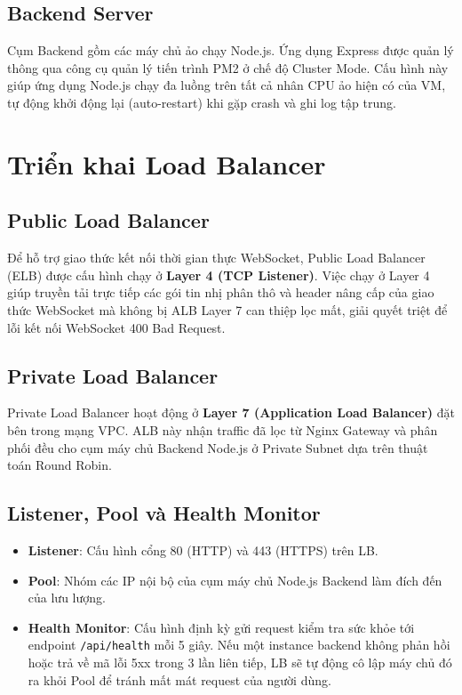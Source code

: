 \documentclass[12pt, a4paper]{article}
\begin{document}
\subsection{Backend Server}
Cụm Backend gồm các máy chủ ảo chạy Node.js. Ứng dụng Express được quản lý thông qua công cụ quản lý tiến trình PM2 ở chế độ Cluster Mode. Cấu hình này giúp ứng dụng Node.js chạy đa luồng trên tất cả nhân CPU ảo hiện có của VM, tự động khởi động lại (auto-restart) khi gặp crash và ghi log tập trung.



\section{Triển khai Load Balancer}

\subsection{Public Load Balancer}
Để hỗ trợ giao thức kết nối thời gian thực WebSocket, Public Load Balancer (ELB) được cấu hình chạy ở \textbf{Layer 4 (TCP Listener)}. Việc chạy ở Layer 4 giúp truyền tải trực tiếp các gói tin nhị phân thô và header nâng cấp của giao thức WebSocket mà không bị ALB Layer 7 can thiệp lọc mất, giải quyết triệt để lỗi kết nối WebSocket 400 Bad Request.

\subsection{Private Load Balancer}
Private Load Balancer hoạt động ở \textbf{Layer 7 (Application Load Balancer)} đặt bên trong mạng VPC. ALB này nhận traffic đã lọc từ Nginx Gateway và phân phối đều cho cụm máy chủ Backend Node.js ở Private Subnet dựa trên thuật toán Round Robin.

\subsection{Listener, Pool và Health Monitor}
\begin{itemize}
    \item \textbf{Listener}: Cấu hình cổng 80 (HTTP) và 443 (HTTPS) trên LB.
    \item \textbf{Pool}: Nhóm các IP nội bộ của cụm máy chủ Node.js Backend làm đích đến của lưu lượng.
    \item \textbf{Health Monitor}: Cấu hình định kỳ gửi request kiểm tra sức khỏe tới endpoint \texttt{/api/health} mỗi 5 giây. Nếu một instance backend không phản hồi hoặc trả về mã lỗi 5xx trong 3 lần liên tiếp, LB sẽ tự động cô lập máy chủ đó ra khỏi Pool để tránh mất mát request của người dùng.
\end{itemize}
\end{document}
